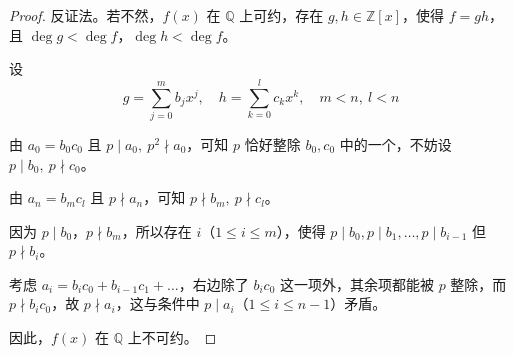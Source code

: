 \begin{proof}
	反证法。若不然，\(f(x)\) 在 \(\mathbb{Q}\) 上可约，存在 \(g,h\in\mathbb{Z}[x]\)，使得 \(f=gh\)，且 \(\deg g<\deg f\)，\(\deg h<\deg f\)。
	
	设
	\[
	g=\sum_{j=0}^m b_jx^j,\quad h=\sum_{k=0}^l c_kx^k,\quad m<n,\ l<n
	\]
	
	由 \(a_0=b_0c_0\) 且 \(p\mid a_0,\ p^2\nmid a_0\)，可知 \(p\) 恰好整除 \(b_0,c_0\) 中的一个，不妨设 \(p\mid b_0,\ p\nmid c_0\)。
	
	由 \(a_n=b_mc_l\) 且 \(p\nmid a_n\)，可知 \(p\nmid b_m,\ p\nmid c_l\)。
	
	因为 \(p\mid b_0\)，\(p\nmid b_m\)，所以存在 \(i\)（\(1\le i\le m\)），使得 \(p\mid b_0,p\mid b_1,\dots,p\mid b_{i-1}\) 但 \(p\nmid b_i\)。
	
	考虑 \(a_i=b_ic_0+b_{i-1}c_1+\dots\)，右边除了 \(b_ic_0\) 这一项外，其余项都能被 \(p\) 整除，而 \(p\nmid b_ic_0\)，故 \(p\nmid a_i\)，这与条件中 \(p\mid a_i\)（\(1\le i\le n-1\)）矛盾。
	
	因此，\(f(x)\) 在 \(\mathbb{Q}\) 上不可约。
	
\end{proof}
